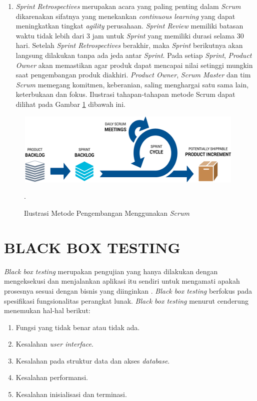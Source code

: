\begin {enumerate}[1.]
\item \textit{Sprint Retrospectives} merupakan acara yang paling penting dalam \textit{Scrum} dikarenakan sifatnya yang menekankan \textit{continuous learning} yang dapat meningkatkan tingkat \textit{agility} perusahaan. \textit{Sprint Review} memiliki batasan waktu tidak lebih dari 3 jam untuk \textit{Sprint} yang memiliki durasi selama 30 hari. Setelah \textit{Sprint Retrospectives} berakhir, maka \textit{Sprint} berikutnya akan langsung dilakukan tanpa ada jeda antar \textit{Sprint}. Pada setiap \textit{Sprint}, \textit{Product Owner} akan memastikan agar produk dapat mencapai nilai setinggi mungkin saat pengembangan produk diakhiri. \textit{Product Owner}, \textit{Scrum Master} dan tim \textit{Scrum} memegang komitmen, keberanian, saling menghargai satu sama lain, keterbukaan dan fokus. Ilustrasi tahapan-tahapan metode Scrum dapat dilihat pada Gambar \ref{scrum} dibawah ini.
\end{enumerate} 

\vspace{0,2cm}
\begin{figure}[H]
	\centering
	\shadowbox
	{\includegraphics [width = 11cm, height= 3.5cm]{gambar/scrum}}
	\caption{Ilustrasi Metode Pengembangan Menggunakan \textit{Scrum} \citep{Schwab2013}}.
	\label{scrum}
\end{figure}


\section{\uppercase{BLACK BOX TESTING}}
\textit{Black box testing} merupakan pengujian yang hanya dilakukan dengan mengeksekusi dan menjalankan aplikasi itu sendiri untuk mengamati apakah prosesnya sesuai dengan bisnis yang diinginkan \citep{Alfatta2007}. \textit{Black box testing} berfokus pada spesifikasi fungsionalitas perangkat lunak. \textit{Black box testing} menurut \citep{Mustaqbal2015} cenderung menemukan hal-hal berikut:
\begin{enumerate}[1.]
\item Fungsi yang tidak benar atau tidak ada.
\item Kesalahan \textit{user interface}.
\item Kesalahan pada struktur data dan akses \textit{database}.
\item Kesalahan performansi.
\item Kesalahan inisialisasi dan terminasi.
\end{enumerate}

